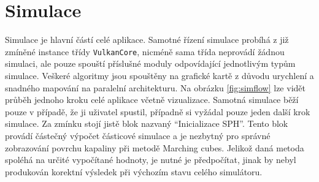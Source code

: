 \section{Simulace}
\label{chapter:simulace}
Simulace je hlavní částí celé aplikace. Samotné řízení simulace probíhá z již zmíněné instance třídy \texttt{VulkanCore}, nicméně sama třída neprovádí žádnou simulaci, ale pouze spouští příslušné moduly odpovídající jednotlivým typům simulace. Veškeré algoritmy jsou spouštěny na grafické kartě z důvodu urychlení a snadného mapování na paralelní architekturu. Na obrázku \ref{fig:simflow} lze vidět průběh jednoho kroku celé aplikace včetně vizualizace. Samotná simulace běží pouze v případě, že ji uživatel spustil, případně si vyžádal pouze jeden další krok simulace. Za zmínku stojí jistě blok nazvaný \enquote{Inicializace SPH}. Tento blok provádí částečný výpočet částicové simulace a je nezbytný pro správné zobrazování povrchu kapaliny při metodě Marching cubes. Jelikož daná metoda spoléhá na určité vypočítané hodnoty, je nutné je předpočítat, jinak by nebyl produkován korektní výsledek při výchozím stavu celého simulátoru.

